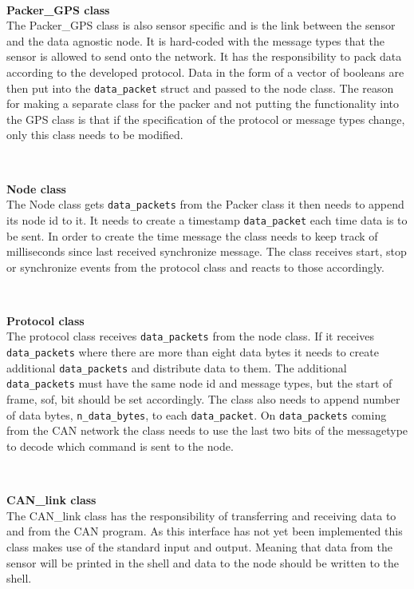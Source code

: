 ~\\ \par \textbf{Packer\_GPS class} ~ \\
The Packer\_GPS class is also sensor specific and is the link between the sensor and the data agnostic node.
It is hard-coded with the message types that the sensor is allowed to send onto the network.
It has the responsibility to pack data according to the developed protocol.
Data in the form of a vector of booleans are then put into the \texttt{data\_packet} struct and passed to the node class.
The reason for making a separate class for the packer and not putting the functionality into the GPS class is that if the specification of the protocol or message types change, only this class needs to be modified.

~\\ \par \textbf{Node class} ~ \\
The Node class gets \texttt{data\_packets} from the Packer class it then needs to append its node id to it.
It needs to create a timestamp \texttt{data\_packet} each time data is to be sent.
In order to create the time message the class needs to keep track of milliseconds since last received synchronize message.
The class receives start, stop or synchronize events from the protocol class and reacts to those accordingly.

~\\ \par \textbf{Protocol class} ~ \\
The protocol class receives \texttt{data\_packets} from the node class. 
If it receives \texttt{data\_packets} where there are more than eight data bytes it needs to create additional \texttt{data\_packets} and distribute data to them. 
The additional \texttt{data\_packets} must have the same node id and message types, but the start of frame, sof, bit should be set accordingly.
The class also needs to append number of data bytes, \texttt{n\_data\_bytes}, to each \texttt{data\_packet}.
On \texttt{data\_packets} coming from the CAN network the class needs to use the last two bits of the messagetype to decode which command is sent to the node.

~\\ \par \textbf{CAN\_link class} ~ \\
The CAN\_link class has the responsibility of transferring and receiving data to and from the CAN program.
As this interface has not yet been implemented this class makes use of the standard input and output. 
Meaning that data from the sensor will be printed in the shell and data to the node should be written to the shell. 

